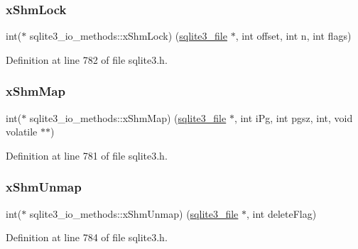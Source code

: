 \subsubsection{\texorpdfstring{x\+Shm\+Lock}{xShmLock}}
{\footnotesize\ttfamily int($\ast$ sqlite3\+\_\+io\+\_\+methods\+::x\+Shm\+Lock) (\mbox{\hyperlink{structsqlite3__file}{sqlite3\+\_\+file}} $\ast$, int offset, int n, int flags)}



Definition at line 782 of file sqlite3.\+h.

\mbox{\label{structsqlite3__io__methods_a2222efe012f210417f9881103014cdc5}} 
\subsubsection{\texorpdfstring{x\+Shm\+Map}{xShmMap}}
{\footnotesize\ttfamily int($\ast$ sqlite3\+\_\+io\+\_\+methods\+::x\+Shm\+Map) (\mbox{\hyperlink{structsqlite3__file}{sqlite3\+\_\+file}} $\ast$, int i\+Pg, int pgsz, int, void volatile $\ast$$\ast$)}



Definition at line 781 of file sqlite3.\+h.

\mbox{\label{structsqlite3__io__methods_a494ae8bbfe91c38598c73aaa18f1848f}} 
\subsubsection{\texorpdfstring{x\+Shm\+Unmap}{xShmUnmap}}
{\footnotesize\ttfamily int($\ast$ sqlite3\+\_\+io\+\_\+methods\+::x\+Shm\+Unmap) (\mbox{\hyperlink{structsqlite3__file}{sqlite3\+\_\+file}} $\ast$, int delete\+Flag)}



Definition at line 784 of file sqlite3.\+h.

\mbox{\label{structsqlite3__io__methods_ad4b78f6b0b475e621fe29fb1cc886437}} 
